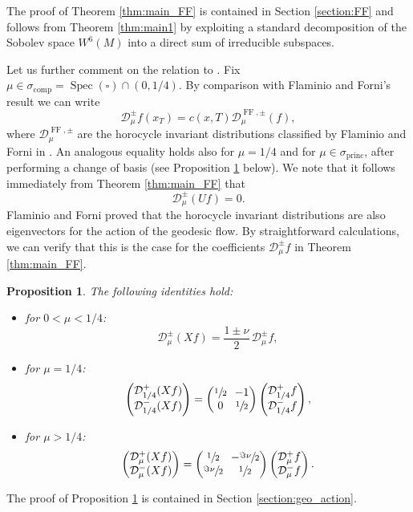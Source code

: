 \documentclass[10pt]{amsart}
\newcommand{\Dp}[1]{\mathcal{D}_\mu^{+} #1}
\newcommand{\Dm}[1]{\mathcal{D}_\mu^{-} #1}
\newcommand{\Dpm}[1]{\mathcal{D}_\mu^{\pm} #1}
\newcommand{\Dpmp}[1]{\mathcal{D}_\mu^{\pm}(#1)}
\DeclareMathOperator{\Spec}{Spec}
\DeclareMathOperator{\comp}{comp}
\DeclareMathOperator{\princ}{princ}
\DeclareMathOperator{\FF}{FF}
\newtheorem {proposition}[theorem]{Proposition}
\theoremstyle{definition}
\begin{document}
The proof of Theorem \ref{thm:main_FF} is contained in Section \ref{section:FF} and follows from Theorem \ref{thm:main1} by exploiting a standard decomposition of the Sobolev space $W^6(M)$ into a direct sum of irreducible subspaces.

Let us further comment on the relation to \cite[Th.\,1.5]{FlaFo}. Fix $\mu \in \sigma_{\comp} = \Spec(\square) \cap (0,1/4)$.
By comparison with Flaminio and Forni's result we can write
\[
\Dpm{f}(x_T) = c(x,T) \mathcal{D}^{\FF, \pm}_\mu (f),
\]
where $\mathcal{D}^{\FF, \pm}_\mu$ are the horocycle invariant distributions classified by Flaminio and Forni in \cite{FlaFo}.
An analogous equality holds also for $\mu = 1/4$ and for $\mu \in \sigma_{\princ}$, after performing a change of basis (see Proposition \ref{thm:eigenvectors} below). We note that it follows immediately from Theorem \ref{thm:main_FF} that
\[
\Dpmp{Uf} =0.
\]
Flaminio and Forni proved that the horocycle invariant distributions are also eigenvectors for the action of the geodesic flow. By straightforward calculations, we can verify that this is the case for the coefficients $\Dpm{f}$ in Theorem \ref{thm:main_FF}.

\begin{proposition}\label{thm:eigenvectors}
The following identities hold:
\begin{itemize}
\item for $0<\mu< 1/4$:
\[
\Dpmp{Xf} = \frac{1\pm \nu}{2}\, \Dpm{f},
\]
\item for $\mu=1/4$:
\[\arraycolsep3.5pt
\begin{pmatrix}
\mathcal{D}^{+}_{1/4}(Xf) \\
\mathcal{D}^{-}_{1/4}(Xf)
\end{pmatrix}
=
\begin{pmatrix}
\sfrac{1}{2} & -1 \\
0 & \sfrac{1}{2}
\end{pmatrix}
\begin{pmatrix}
\mathcal{D}^{+}_{1/4}f \\
\mathcal{D}^{-}_{1/4}f
\end{pmatrix},
\]
\item for $\mu > 1/4$:
\[\arraycolsep3.5pt
\begin{pmatrix}
\Dp{(Xf)} \\
\Dm{(Xf)}
\end{pmatrix}
=
\begin{pmatrix}
\sfrac{1}{2} & -\sfrac{\Im \nu}{2} \\
\sfrac{\Im \nu}{2} & \sfrac{1}{2}
\end{pmatrix}
\begin{pmatrix}
\Dp{f} \\
\Dm{f}
\end{pmatrix}.
\]
\end{itemize}
\end{proposition}
The proof of Proposition \ref{thm:eigenvectors} is contained in Section \ref{section:geo_action}.
\end{document}
